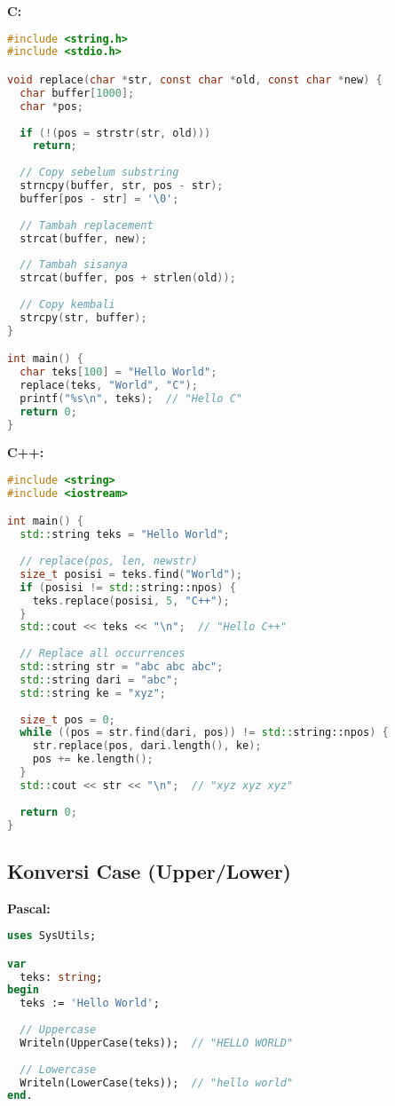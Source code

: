\documentclass[../main.tex]{subfiles}
\begin{document}
\textbf{C:}
\begin{lstlisting}[language=C, caption={Replace di C (manual)}]
#include <string.h>
#include <stdio.h>

void replace(char *str, const char *old, const char *new) {
  char buffer[1000];
  char *pos;
  
  if (!(pos = strstr(str, old)))
    return;
  
  // Copy sebelum substring
  strncpy(buffer, str, pos - str);
  buffer[pos - str] = '\0';
  
  // Tambah replacement
  strcat(buffer, new);
  
  // Tambah sisanya
  strcat(buffer, pos + strlen(old));
  
  // Copy kembali
  strcpy(str, buffer);
}

int main() {
  char teks[100] = "Hello World";
  replace(teks, "World", "C");
  printf("%s\n", teks);  // "Hello C"
  return 0;
}
\end{lstlisting}

\textbf{C++:}
\begin{lstlisting}[language=C++, caption={Replace di C++}]
#include <string>
#include <iostream>

int main() {
  std::string teks = "Hello World";
  
  // replace(pos, len, newstr)
  size_t posisi = teks.find("World");
  if (posisi != std::string::npos) {
    teks.replace(posisi, 5, "C++");
  }
  std::cout << teks << "\n";  // "Hello C++"
  
  // Replace all occurrences
  std::string str = "abc abc abc";
  std::string dari = "abc";
  std::string ke = "xyz";
  
  size_t pos = 0;
  while ((pos = str.find(dari, pos)) != std::string::npos) {
    str.replace(pos, dari.length(), ke);
    pos += ke.length();
  }
  std::cout << str << "\n";  // "xyz xyz xyz"
  
  return 0;
}
\end{lstlisting}

\subsection{Konversi Case (Upper/Lower)}

\textbf{Pascal:}
\begin{lstlisting}[language=Pascal, caption={Case conversion di Pascal}]
uses SysUtils;

var
  teks: string;
begin
  teks := 'Hello World';
  
  // Uppercase
  Writeln(UpperCase(teks));  // "HELLO WORLD"
  
  // Lowercase
  Writeln(LowerCase(teks));  // "hello world"
end.
\end{lstlisting}
\end{document}
